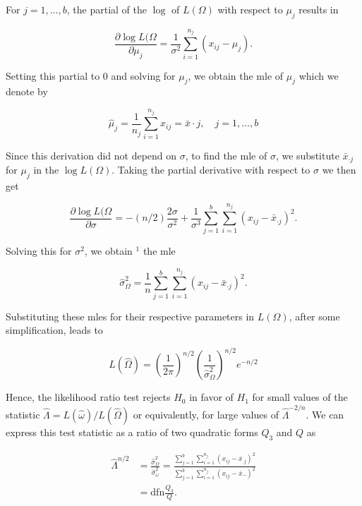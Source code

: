 For $j=1, \ldots, b$, the partial of the $\log$ of $L(\Omega)$ with respect to $\mu_{j}$ results in

$$
\frac{\partial \log L(\Omega}{\partial \mu_{j}}=\frac{1}{\sigma^{2}} \sum_{i=1}^{n_{j}}\left(x_{i j}-\mu_{j}\right) .
$$

Setting this partial to 0 and solving for $\mu_{j}$, we obtain the mle of $\mu_{j}$ which we denote by


\begin{equation*}
\hat{\mu}_{j}=\frac{1}{n_{j}} \sum_{i=1}^{n_{j}} x_{i j}=\bar{x} \cdot j, \quad j=1, \ldots, b \tag{9.2.6}
\end{equation*}


Since this derivation did not depend on $\sigma$, to find the mle of $\sigma$, we substitute $\bar{x}_{\cdot j}$ for $\mu_{j}$ in the $\log L(\Omega)$. Taking the partial derivative with respect to $\sigma$ we then get

$$
\frac{\partial \log L(\Omega}{\partial \sigma}=-(n / 2) \frac{2 \sigma}{\sigma^{2}}+\frac{1}{\sigma^{3}} \sum_{j=1}^{b} \sum_{i=1}^{n_{j}}\left(x_{i j}-\bar{x}_{\cdot j}\right)^{2} .
$$

Solving this for $\sigma^{2}$, we obtain ${ }^{1}$ the mle


\begin{equation*}
\hat{\sigma}_{\Omega}^{2}=\frac{1}{n} \sum_{j=1}^{b} \sum_{i=1}^{n_{j}}\left(x_{i j}-\bar{x}_{\cdot j}\right)^{2} . \tag{9.2.7}
\end{equation*}


Substituting these mles for their respective parameters in $L(\Omega)$, after some simplification, leads to


\begin{equation*}
L(\hat{\Omega})=\left(\frac{1}{2 \pi}\right)^{n / 2}\left(\frac{1}{\hat{\sigma}_{\Omega}^{2}}\right)^{n / 2} e^{-n / 2} \tag{9.2.8}
\end{equation*}


Hence, the likelihood ratio test rejects $H_{0}$ in favor of $H_{1}$ for small values of the statistic $\hat{\Lambda}=L(\hat{\omega}) / L(\hat{\Omega})$ or equivalently, for large values of $\hat{\Lambda}^{-2 / n}$. We can express this test statistic as a ratio of two quadratic forms $Q_{3}$ and $Q$ as


\begin{align*}
\hat{\Lambda}^{n / 2} & =\frac{\hat{\sigma}_{\Omega}^{2}}{\hat{\sigma}_{\omega}^{2}}=\frac{\sum_{j=1}^{b} \sum_{i=1}^{n_{j}}\left(x_{i j}-\bar{x}_{. j}\right)^{2}}{\sum_{j=1}^{b} \sum_{i=1}^{n_{j}}\left(x_{i j}-\bar{x} . .\right)^{2}} \\
& =\mathrm{dfn} \frac{Q_{3}}{Q} . \tag{9.2.9}
\end{align*}


